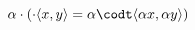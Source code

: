 \documentclass[preview]{standalone}
\begin{document}
\begin{center}
$\alpha \cdot ( \cdot \langle x, y \rangle = \alpha \codt \langle \alpha x, \alpha y \rangle)$
\end{center}
\end{document}
